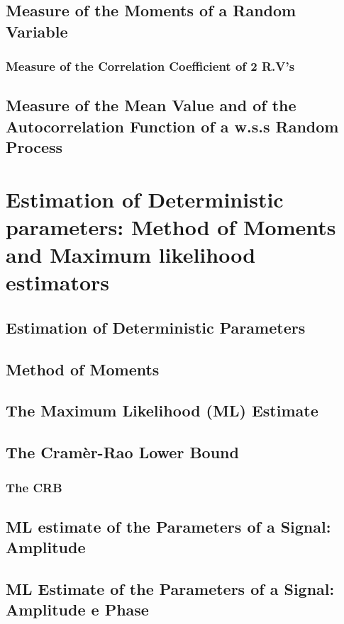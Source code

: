 \subsection{Measure of the Moments of a Random Variable}
\subsubsection{Measure of the Correlation Coefficient of 2 R.V's}
\subsection{Measure of the Mean Value and of the Autocorrelation Function of a w.s.s Random Process}


\section{Estimation of Deterministic parameters: Method of Moments and Maximum likelihood estimators}

\subsection{Estimation of Deterministic Parameters}

\subsection{Method of Moments}

\subsection{The Maximum Likelihood (ML) Estimate}

\subsection{The Cramèr-Rao Lower Bound}
\subsubsection{The CRB}

\subsection{ML estimate of the Parameters of a Signal: Amplitude}

\subsection{ML Estimate of the Parameters of a Signal: Amplitude e Phase}

